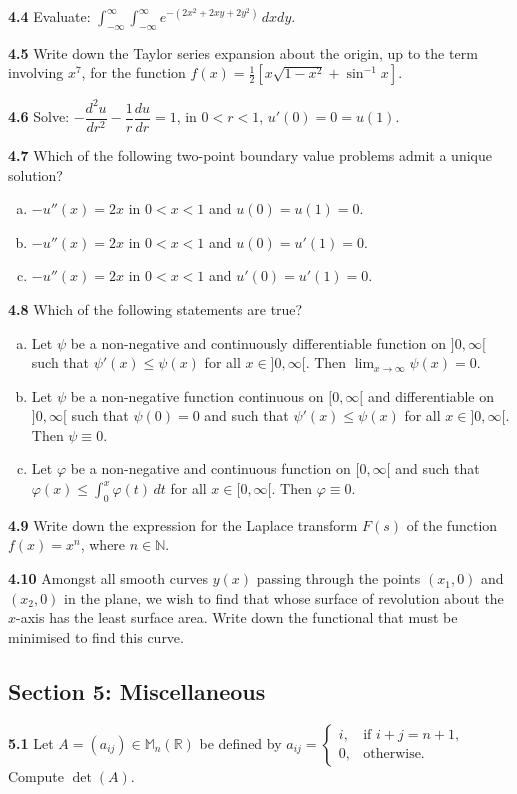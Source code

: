 \documentclass[11pt,a4paper]{article}
\newcommand{\N}{\mathbb{N}}
\newcommand{\R}{\mathbb{R}}
\newcommand{\M}{\mathbb{M}}
\newcommand{\examsec}[1]{%
  \subsection*{#1}
  \vspace{-2pt}
}
\newcommand{\qitem}[1]{\par\medskip\noindent\textbf{#1}\hspace{0.5em}}
\begin{document}
\qitem{4.4} Evaluate: $\displaystyle\int_{-\infty}^{\infty}\int_{-\infty}^{\infty} e^{-(2x^2 + 2xy + 2y^2)}\,dxdy$.

\qitem{4.5} Write down the Taylor series expansion about the origin, up to the term involving $x^7$, for the function $f(x) = \frac{1}{2}\left[x\sqrt{1 - x^2} + \sin^{-1} x\right]$.

\qitem{4.6} Solve: $-\dfrac{d^2 u}{dr^2} - \dfrac{1}{r}\dfrac{du}{dr} = 1$, in $0 < r < 1$, $u'(0) = 0 = u(1)$.

\qitem{4.7} Which of the following two-point boundary value problems admit a unique solution?
\begin{enumerate}[a.]
  \item $-u''(x) = 2x$ in $0 < x < 1$ and $u(0) = u(1) = 0$.
  \item $-u''(x) = 2x$ in $0 < x < 1$ and $u(0) = u'(1) = 0$.
  \item $-u''(x) = 2x$ in $0 < x < 1$ and $u'(0) = u'(1) = 0$.
\end{enumerate}

\qitem{4.8} Which of the following statements are true?
\begin{enumerate}[a.]
  \item Let $\psi$ be a non-negative and continuously differentiable function on $]0, \infty[$ such that $\psi'(x) \le \psi(x)$ for all $x \in ]0, \infty[$. Then $\lim_{x \to \infty} \psi(x) = 0$.
  \item Let $\psi$ be a non-negative function continuous on $[0, \infty[$ and differentiable on $]0, \infty[$ such that $\psi(0) = 0$ and such that $\psi'(x) \le \psi(x)$ for all $x \in ]0, \infty[$. Then $\psi \equiv 0$.
  \item Let $\varphi$ be a non-negative and continuous function on $[0, \infty[$ and such that $\varphi(x) \le \int_0^x \varphi(t)\,dt$ for all $x \in [0, \infty[$. Then $\varphi \equiv 0$.
\end{enumerate}

\qitem{4.9} Write down the expression for the Laplace transform $F(s)$ of the function $f(x) = x^n$, where $n \in \N$.

\qitem{4.10} Amongst all smooth curves $y(x)$ passing through the points $(x_1, 0)$ and $(x_2, 0)$ in the plane, we wish to find that whose surface of revolution about the $x$-axis has the least surface area. Write down the functional that must be minimised to find this curve.

\examsec{Section 5: Miscellaneous}

\qitem{5.1} Let $A = (a_{ij}) \in \M_n(\R)$ be defined by $a_{ij} = \begin{cases} i, & \text{if } i + j = n + 1, \\ 0, & \text{otherwise.} \end{cases}$ Compute $\det(A)$.
\end{document}
